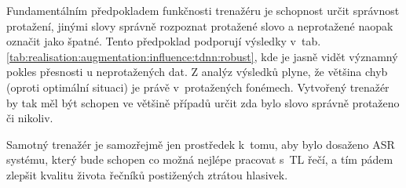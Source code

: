 Fundamentálním předpokladem funkčnosti trenažéru je schopnost určit správnost protažení, jinými slovy správně rozpoznat protažené slovo a neprotažené naopak označit jako špatné. Tento předpoklad podporují výsledky v~tab. \ref{tab:realisation:augmentation:influence:tdnn:robust}, kde je jasně vidět významný pokles přesnosti u neprotažených dat. Z analýz výsledků plyne, že většina chyb (oproti optimální situaci) je právě v~protažených fonémech. Vytvořený trenažér by tak měl být schopen ve většině případů určit zda bylo slovo správně protaženo či nikoliv.

Samotný trenažér je samozřejmě jen prostředek  k~tomu, aby bylo dosaženo ASR systému, který bude schopen co možná nejlépe pracovat s~TL řečí, a tím pádem zlepšit kvalitu života řečníků postižených ztrátou hlasivek.


